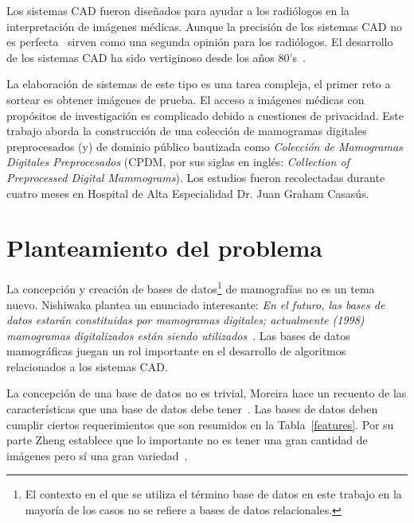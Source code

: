 Los sistemas CAD fueron diseñados para ayudar a los radiólogos en la
interpretación de imágenes médicas. Aunque la precisión de los sistemas CAD no
es perfecta~\cite{fenton2007influence} sirven como una segunda opinión para los
radiólogos. El desarrollo de los sistemas CAD ha sido vertiginoso desde los
años 80's~\cite{giger2008anniversary}.

La elaboración de sistemas de este tipo es una tarea compleja, el primer reto a
sortear es obtener imágenes de prueba. El acceso a imágenes médicas con
propósitos de investigación es complicado debido a cuestiones de privacidad.
Este trabajo aborda la construcción de una colección de mamogramas digitales
preprocesados (y) de dominio público bautizada como \textit{Colección de
Mamogramas Digitales Preprocesados} (CPDM, por sus siglas en inglés:
\textit{Collection of Preprocessed Digital Mammograms}). Los estudios fueron
recolectadas durante cuatro meses en Hospital de Alta Especialidad Dr. Juan
Graham Casasús.

\section{Planteamiento del problema}

La concepción y creación de bases de datos\footnote{El contexto en el que se
utiliza el término base de datos en este trabajo en la mayoría de los casos no
se refiere a bases de datos relacionales.} de mamografías no es un tema nuevo.
Nishiwaka plantea un enunciado interesante: \textit{En el futuro, las bases de
datos estarán constituidas por mamogramas digitales; actualmente (1998)
mamogramas digitalizados están siendo
utilizados}~\cite{nishikawa1998mammographic}. Las bases de datos mamográficas
juegan un rol importante en el desarrollo de algoritmos relacionados a los
sistemas CAD. 

La concepción de una base de datos no es trivial, Moreira hace un recuento de
las características que una base de datos debe
tener~\cite{moreira2012compliance}. Las bases de datos deben cumplir ciertos
requerimientos que son resumidos en la Tabla~\ref{features}. Por su parte Zheng
establece que lo importante no es tener una gran cantidad de imágenes pero sí
una gran variedad~\cite{zheng2010computer}.


